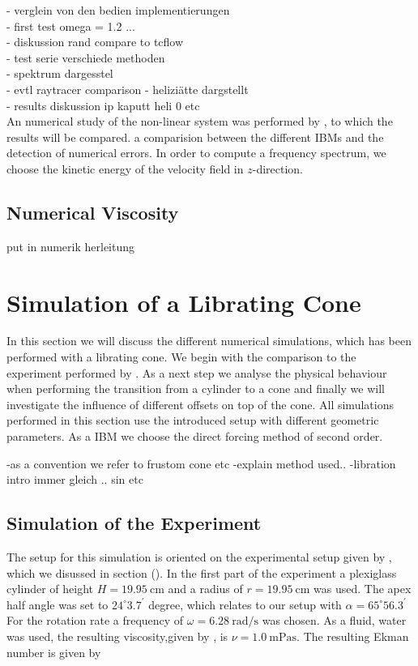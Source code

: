 - verglein von den bedien implementierungen\\
- first test omega = 1.2 ...\\
- diskussion rand compare to tcflow \\
- test serie verschiede methoden\\
- spektrum dargesstel\\
- evtl raytracer  comparison
- heliziätte dargstellt\\
- results diskussion ip kaputt heli 0 etc \\
An numerical study of the non-linear system was performed by \citep{BLA}, to which the results will be compared.
a comparision between the different IBMs and the detection of numerical errors.
In order to compute a frequency spectrum, we choose the kinetic energy of the velocity field in $z$-direction.

\subsection{Numerical Viscosity}
put in numerik herleitung

\newpage

\section{Simulation of a Librating Cone}

In this section we will discuss the different numerical simulations, which has been performed
with a librating cone. We begin with the comparison to the experiment performed by \citep{Beardsley1970}.
As a next step we analyse the physical behaviour when performing the transition from a cylinder
to a cone and finally  we will investigate the influence of different offsets on top of the cone.
All simulations performed in this section use the introduced setup with different geometric parameters.
As a IBM we choose the direct forcing  method of second order.

-as a convention we refer to frustom cone etc
-explain method used..
-libration intro immer gleich .. sin etc

\subsection{Simulation of the Experiment}

The setup for this simulation is oriented on the experimental setup given by \citep{Beardsley1970}, which
we disussed in section ().
In the first part of the experiment a plexiglass cylinder of height $H=\SI{19.95}{\centi\meter}$ and a radius of
$r=\SI{19.95}{\centi\meter}$ was used. The apex half angle was set to $24^{\circ}3.7^{\prime}$ degree,
which relates to our setup with $\alpha=65^{\circ}56.3^{\prime}$
For the rotation rate a frequency of $\omega =\SI{6.28}{\radian\per\second}$ was chosen.
As a fluid, water was used, the resulting viscosity,given by \citep{tipler2003}, is $\nu = \SI{1.0}{\milli\pascal\second}$.
The resulting Ekman number is given by

